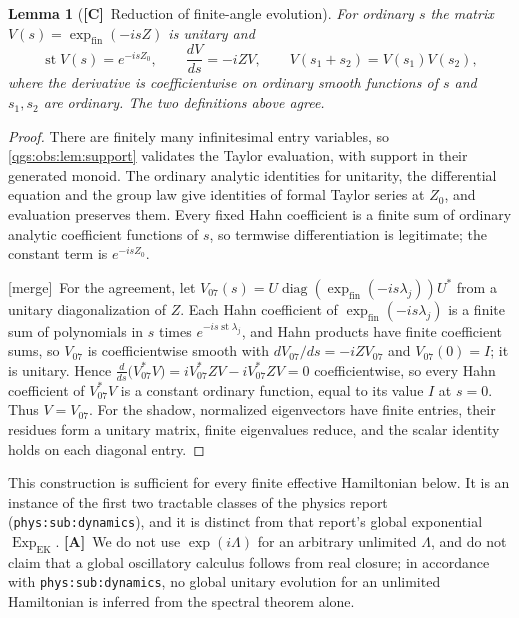 \documentclass[11pt,oneside]{article}
\numberwithin{equation}{section}
\theoremstyle{plain}
\newtheorem{lemma}[lemma]{Lemma}
\theoremstyle{definition}
\theoremstyle{remark}
\newcommand{\expfin}{\exp_{\mathrm{fin}}}
\DeclareMathOperator{\st}{st}
\DeclareMathOperator{\diag}{diag}
\newcommand{\TC}{\textcolor{TierC}{\textsf{\bfseries[C]}}}
\newcommand{\TA}{\textcolor{TierA}{\textsf{\bfseries[A]}}}
\newcommand{\merge}{{\small\textsf{[merge]}}}
\begin{document}
\begin{lemma}[\TC\ Reduction of finite-angle evolution]\label{qgs:obs:lem:exponential}
For ordinary $s$ the matrix $V(s)=\expfin(-isZ)$ is unitary and
\begin{equation}\label{qgs:eq:exp-shadow}
 \st V(s)=e^{-isZ_0},\qquad
 \frac{dV}{ds}=-iZV,\qquad V(s_1+s_2)=V(s_1)V(s_2),
\end{equation}
where the derivative is coefficientwise on ordinary smooth functions of $s$ and $s_1,s_2$ are ordinary. The two definitions above agree.
\end{lemma}
\begin{proof}
There are finitely many infinitesimal entry variables, so \cref{qgs:obs:lem:support} validates the Taylor evaluation, with support in their generated monoid. The ordinary analytic identities for unitarity, the differential equation and the group law give identities of formal Taylor series at $Z_0$, and evaluation preserves them. Every fixed Hahn coefficient is a finite sum of ordinary analytic coefficient functions of $s$, so termwise differentiation is legitimate; the constant term is $e^{-isZ_0}$.

\merge\ For the agreement, let $V_{07}(s)=U\diag(\expfin(-is\lambda_j))U^*$ from a unitary diagonalization of $Z$. Each Hahn coefficient of $\expfin(-is\lambda_j)$ is a finite sum of polynomials in $s$ times $e^{-is\st\lambda_j}$, and Hahn products have finite coefficient sums, so $V_{07}$ is coefficientwise smooth with $dV_{07}/ds=-iZV_{07}$ and $V_{07}(0)=I$; it is unitary. Hence $\frac{d}{ds}\bigl(V_{07}^*V\bigr)=iV_{07}^*ZV-iV_{07}^*ZV=0$ coefficientwise, so every Hahn coefficient of $V_{07}^*V$ is a constant ordinary function, equal to its value $I$ at $s=0$. Thus $V=V_{07}$. For the shadow, normalized eigenvectors have finite entries, their residues form a unitary matrix, finite eigenvalues reduce, and the scalar identity holds on each diagonal entry.
\end{proof}

This construction is sufficient for every finite effective Hamiltonian below. It is an instance of the first two tractable classes of the physics report (\texttt{phys:sub:dynamics}), and it is distinct from that report's global exponential $\operatorname{Exp}_{\mathrm{EK}}$. \TA\ We do not use $\exp(i\Lambda)$ for an arbitrary unlimited $\Lambda$, and do not claim that a global oscillatory calculus follows from real closure; in accordance with \texttt{phys:sub:dynamics}, no global unitary evolution for an unlimited Hamiltonian is inferred from the spectral theorem alone.
\end{document}
